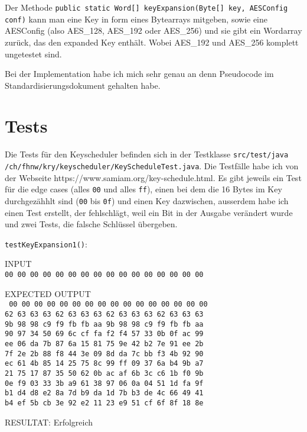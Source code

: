 \documentclass[12pt, letterpaper]{article}
\newcommand{\code}[1]{\texttt{#1}}
\begin{document}
Der Methode \code{public static Word[] keyExpansion(Byte[] key, AESConfig conf)} kann man eine Key in form eines Bytearrays mitgeben, sowie eine AESConfig (also AES\_128, AES\_192 oder AES\_256) und sie gibt ein Wordarray zurück, das den expanded Key enthält. Wobei AES\_192 und AES\_256 komplett ungetestet sind.

Bei der Implementation habe ich mich sehr genau an denn Pseudocode im Standardisierungsdokument gehalten habe.

\newpage
\section*{Tests}
Die Tests für den Keyscheduler befinden sich in der Testklasse \code{src/test/java /ch/fhnw/kry/keyscheduler/KeyScheduleTest.java}. Die Testfälle habe ich von der Webseite https://www.samiam.org/key-schedule.html. Es gibt jeweils ein Test für die edge cases (alles \code{00} und alles \code{ff}), einen bei dem die 16 Bytes im Key durchgezähhlt sind (\code{00} bis \code{0f}) und einen Key dazwischen, ausserdem habe ich einen Test erstellt, der fehlschlägt, weil ein Bit in der Ausgabe verändert wurde und zwei Tests, die falsche Schlüssel übergeben.

\code{testKeyExpansion1()}:

INPUT\\
\code{00 00 00 00 00 00 00 00 00 00 00 00 00 00 00 00}

EXPECTED OUTPUT\\
\code{
00 00 00 00 00 00 00 00 00 00 00 00 00 00 00 00\\
62 63 63 63 62 63 63 63 62 63 63 63 62 63 63 63\\
9b 98 98 c9 f9 fb fb aa 9b 98 98 c9 f9 fb fb aa\\
90 97 34 50 69 6c cf fa f2 f4 57 33 0b 0f ac 99\\
ee 06 da 7b 87 6a 15 81 75 9e 42 b2 7e 91 ee 2b\\
7f 2e 2b 88 f8 44 3e 09 8d da 7c bb f3 4b 92 90\\
ec 61 4b 85 14 25 75 8c 99 ff 09 37 6a b4 9b a7\\
21 75 17 87 35 50 62 0b ac af 6b 3c c6 1b f0 9b\\
0e f9 03 33 3b a9 61 38 97 06 0a 04 51 1d fa 9f\\
b1 d4 d8 e2 8a 7d b9 da 1d 7b b3 de 4c 66 49 41\\
b4 ef 5b cb 3e 92 e2 11 23 e9 51 cf 6f 8f 18 8e
}

RESULTAT: {\color{dgreen}Erfolgreich}
\end{document}
